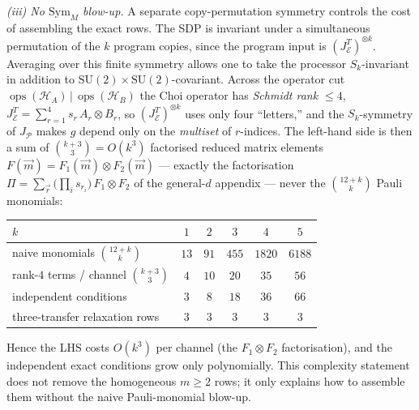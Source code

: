 \documentclass[11pt]{article}
\newcommand{\HH}{\mathcal{H}}
\newcommand{\cP}{\mathcal{P}}
\newcommand{\cE}{\mathcal{E}}
\newcommand{\SU}{\mathrm{SU}}
\newcommand{\ox}{\otimes}
\begin{document}
\smallskip\noindent\emph{(iii) No $\mathrm{Sym}_M$ blow-up.} A separate copy-permutation
symmetry controls the cost of assembling the exact rows. The SDP is invariant under a
simultaneous permutation of the $k$ program copies, since the program input is
$(J_\cE^T)^{\ox k}$. Averaging over this finite symmetry allows one to take the
processor $S_k$-invariant in addition to $\SU(2)\times\SU(2)$-covariant. Across the operator cut
$\operatorname{ops}(\HH_A)\,|\,\operatorname{ops}(\HH_B)$ the Choi operator has \emph{Schmidt
rank $\le4$}, $J_\cE^T=\sum_{r=1}^{4}s_r\,A_r\ox B_r$, so $(J_\cE^T)^{\ox k}$ uses only four
``letters,'' and the $S_k$-symmetry of $J_\cP$ makes $g$ depend only on the \emph{multiset}
of $r$-indices. The left-hand side is then a sum of $\binom{k+3}{3}=O(k^3)$ factorised
reduced matrix elements $F(\vec m)=F_1(\vec m)\ox F_2(\vec m)$ --- exactly the factorisation
$\Pi=\sum_{\vec r}\big(\prod_i s_{r_i}\big)\,F_1\ox F_2$ of the general-$d$ appendix --- never
the $\binom{12+k}{k}$ Pauli monomials:
\begin{center}\small
\begin{tabular}{l|ccccc}
$k$ & $1$ & $2$ & $3$ & $4$ & $5$\\\hline
naive monomials $\binom{12+k}{k}$ & $13$ & $91$ & $455$ & $1820$ & $6188$\\
rank-$4$ terms / channel $\binom{k+3}{3}$ & $4$ & $10$ & $20$ & $35$ & $56$\\
independent conditions & $3$ & $8$ & $18$ & $36$ & $66$\\
three-transfer relaxation rows & $3$ & $3$ & $3$ & $3$ & $3$
\end{tabular}
\end{center}
Hence the LHS costs $O(k^3)$ per channel (the $F_1\ox F_2$ factorisation), and the
independent exact conditions grow only polynomially. This complexity statement does not
remove the homogeneous $m\ge2$ rows; it only explains how to assemble them without the
naive Pauli-monomial blow-up.
\end{document}
